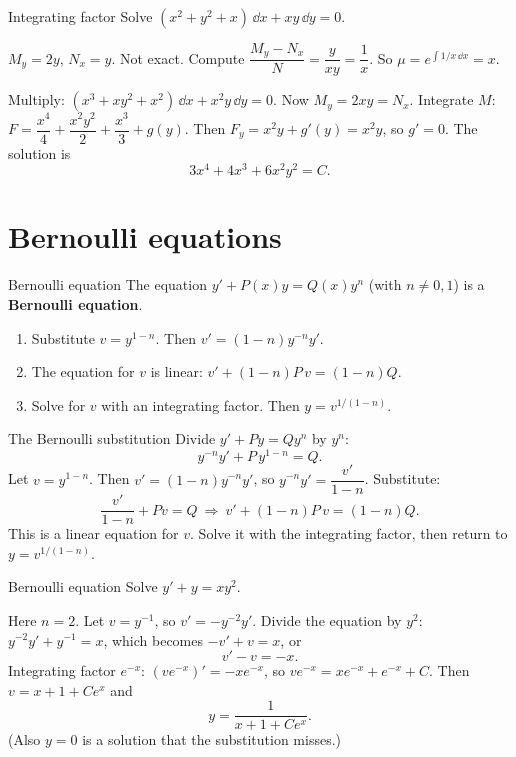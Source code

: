 \begin{examplebox}{Integrating factor}
Solve $(x^2+y^2+x)\,\dd x + xy\,\dd y = 0$.

$M_y = 2y$, $N_x = y$. Not exact. Compute $\dfrac{M_y-N_x}{N} = \dfrac{y}{xy} = \dfrac1x$. So $\mu = e^{\int 1/x\,\dd x} = x$.

Multiply: $(x^3 + xy^2 + x^2)\,\dd x + x^2y\,\dd y = 0$. Now $M_y = 2xy = N_x$. Integrate $M$:
$F = \dfrac{x^4}{4} + \dfrac{x^2y^2}{2} + \dfrac{x^3}{3} + g(y)$. Then $F_y = x^2y + g'(y) = x^2y$, so $g'=0$. The solution is
\[ 3x^4 + 4x^3 + 6x^2y^2 = C. \]
\end{examplebox}

\section{Bernoulli equations}

\begin{methodbox}{Bernoulli equation}
The equation $y' + P(x)y = Q(x)y^{n}$ (with $n \neq 0,1$) is a \textbf{Bernoulli equation}.
\begin{enumerate}
  \item Substitute $v = y^{1-n}$. Then $v' = (1-n)y^{-n}y'$.
  \item The equation for $v$ is linear: $v' + (1-n)P\,v = (1-n)Q$.
  \item Solve for $v$ with an integrating factor. Then $y = v^{1/(1-n)}$.
\end{enumerate}
\end{methodbox}

\begin{derivbox}{The Bernoulli substitution}
Divide $y' + Py = Qy^n$ by $y^n$:
\[ y^{-n}y' + P\,y^{1-n} = Q. \]
Let $v = y^{1-n}$. Then $v' = (1-n)y^{-n}y'$, so $y^{-n}y' = \dfrac{v'}{1-n}$. Substitute:
\[ \frac{v'}{1-n} + Pv = Q \ \Longrightarrow\ v' + (1-n)P\,v = (1-n)Q . \]
This is a linear equation for $v$. Solve it with the integrating factor, then return to $y = v^{1/(1-n)}$.
\end{derivbox}

\begin{examplebox}{Bernoulli equation}
Solve $y' + y = xy^2$.

Here $n=2$. Let $v = y^{-1}$, so $v' = -y^{-2}y'$. Divide the equation by $y^2$: $y^{-2}y' + y^{-1} = x$, which becomes $-v' + v = x$, or
\[ v' - v = -x. \]
Integrating factor $e^{-x}$: $(ve^{-x})' = -xe^{-x}$, so $ve^{-x} = xe^{-x} + e^{-x} + C$. Then $v = x + 1 + Ce^{x}$ and
\[ y = \frac{1}{x + 1 + Ce^{x}}. \]
(Also $y=0$ is a solution that the substitution misses.)
\end{examplebox}

